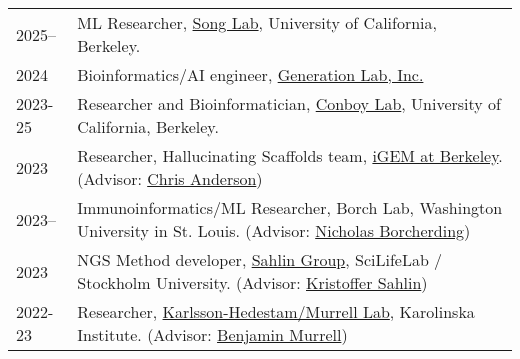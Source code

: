 
\begin{longtable}[l]{@{}p{} p{}}

    2025-- & ML Researcher, \href{https://people.eecs.berkeley.edu/~yss/}{Song Lab}, University of California, Berkeley. \\

    2024 & Bioinformatics/AI engineer, \href{https://www.generationlab.com/}{Generation Lab, Inc.} \\

    2023-25 & Researcher and Bioinformatician, \href{https://conboylab.berkeley.edu/}{Conboy Lab}, University of California, Berkeley. \\

    2023 & Researcher, Hallucinating Scaffolds team, \href{https://igem.studentorg.berkeley.edu/teams/hallucinating-scaffolds/}{iGEM at Berkeley}. (Advisor: \href{https://vcresearch.berkeley.edu/faculty/chris-anderson}{Chris Anderson}) \\

    2023-- & Immunoinformatics/ML Researcher, Borch Lab, Washington University in St. Louis. (Advisor: \href{https://www.borch.dev/}{Nicholas Borcherding}) \\

    2023 & NGS Method developer, \href{https://sahlingroup.github.io/}{Sahlin Group}, SciLifeLab / Stockholm University. (Advisor: \href{https://www.scilifelab.se/researchers/kristoffer-sahlin/}{Kristoffer Sahlin}) \\

    2022-23 & Researcher, \href{https://ki.se/en/people/benjamin-murrell}{Karlsson-Hedestam/Murrell Lab}, Karolinska Institute. (Advisor: \href{https://ki.se/en/people/benjamin-murrell}{Benjamin Murrell})

\end{longtable}
